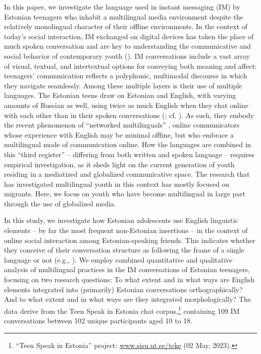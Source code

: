 \documentclass[output=paper]{langscibook}
\begin{document}
In this paper, we investigate the language used in instant messaging (IM) by Estonian teenagers who inhabit a multilingual media environment despite the relatively monolingual character of their offline environments. In the context of today’s social interaction, IM exchanged on digital devices has taken the place of much spoken conversation and are key to understanding the communicative and social behavior of contemporary youth (\citealt{TagliamonteDenis2008, Tagliamonte2016sick}). IM conversations include a vast array of visual, textual, and intertextual options for conveying both meaning and affect: teenagers’ communication reflects a polyphonic, multimodal discourse in which they navigate seamlessly. Among these multiple layers is their use of multiple languages. The Estonian teens draw on Estonian and English, with varying amounts of Russian as well, using twice as much English when they chat online with each other than in their spoken conversations (\citealt{VihmanEtAl2022}; cf. \citealt{Androutsopoulos2005}). As such, they embody the recent phenomenon of “networked multilinguals” \citep{Androutsopoulos2015}, online communicators whose experience with English may be minimal offline, but who embrace a multilingual mode of communication online. How the languages are combined in this “third register” – differing from both written and spoken language – requires empirical investigation, as it sheds light on the current generation of youth residing in a mediatized and globalized communicative space. The research that has investigated multilingual youth in this context has mostly focused on migrants. Here, we focus on youth who have become multilingual in large part through the use of globalized media.

In this study, we investigate how Estonian adolescents use English linguistic elements – by far the most frequent non-Estonian insertions – in the context of online social interaction among Estonian-speaking friends. This indicates whether they conceive of their conversation structure as following the frame of a single language or not (e.g., \citealt{Myers-Scotton2006}). We employ combined quantitative and qualitative analysis of multilingual practices in the IM conversations of Estonian teenagers, focusing on two research questions: To what extent and in what ways are English elements integrated into (primarily) Estonian conversations orthographically? And to what extent and in what ways are they integrated morphologically? The data derive from the Teen Speak in Estonia chat corpus,\footnote{“Teen Speak in Estonia” project: \href{http://www.sisu.ut.ee/teke}{www.sisu.ut.ee/teke} (02 May, 2023).} containing 109 IM conversations between 102 unique participants aged 10 to 18. 
\end{document}
